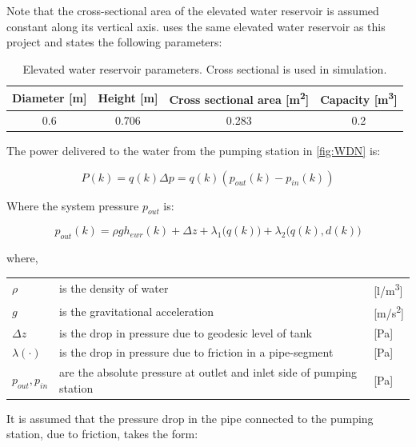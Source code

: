 Note that the cross-sectional area of the elevated water reservoir is assumed constant along its vertical axis. \cite{Rathore930,MathiasJeppe730} uses the same elevated water reservoir as this project and states the following parameters:

\begin{table}[h!]
	\centering
	\begin{tabular}{|c|c|c|c|}
		\hline
		Diameter [\si{m}] & Height [\si{m}] & Cross sectional area [\si{m\squared}] & Capacity [\si{m\cubed}] \\ \hline
		0.6      & 0.706  & 0.283                & 0.2      \\ \hline
	\end{tabular}
	\caption{Elevated water reservoir parameters. Cross sectional is used in simulation.}
	\label{tab:Tank Parameters}
\end{table}

The power delivered to the water from the pumping station in \cref{fig:WDN} is:

\begin{equation}
			P(k) = q(k)\Delta{p}= q(k)(p_{out}(k)-p_{in}(k))
\end{equation}

Where the system pressure $ p_{out} $ is:

\begin{equation}
	p_{out}(k)=\rho g h_{ewr}(k)+\Delta{z}+\lambda_{1}\bigg(q(k)\bigg)+\lambda_{2}\bigg(q(k),d(k)\bigg)
\end{equation}

where,
\begin{center}
	\begin{tabular}{l p{10cm} l}
		$ \rho $ & is the density of water & [\si{l/m^{3}}]\\
		$ g $ & is the gravitational acceleration & [\si{m/s^{2}}]\\
		$\Delta{z}$ & is the drop in pressure due to geodesic level of tank & [\si{Pa}]\\
		$\lambda(\mathord{\cdot})$ & is the drop in pressure due to friction in a pipe-segment & [\si{Pa}] \\
		$p_{out},p_{in}$ & are the absolute pressure at outlet and inlet side of pumping station & [\si{Pa}]\\
	\end{tabular}
\end{center}

It is assumed that the pressure drop in the pipe connected to the pumping station, due to friction, takes the form: 

